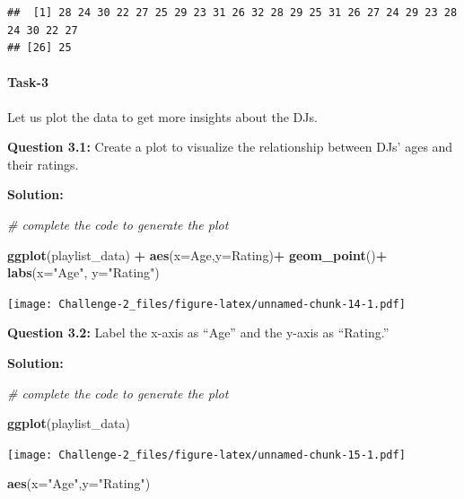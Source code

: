 \documentclass[
]{article}
\newenvironment{Shaded}{\begin{snugshade}}{\end{snugshade}}
\newcommand{\AttributeTok}[1]{\textcolor[rgb]{0.13,0.29,0.53}{#1}}
\newcommand{\CommentTok}[1]{\textcolor[rgb]{0.56,0.35,0.01}{\textit{#1}}}
\newcommand{\FunctionTok}[1]{\textcolor[rgb]{0.13,0.29,0.53}{\textbf{#1}}}
\newcommand{\NormalTok}[1]{#1}
\newcommand{\SpecialCharTok}[1]{\textcolor[rgb]{0.81,0.36,0.00}{\textbf{#1}}}
\newcommand{\StringTok}[1]{\textcolor[rgb]{0.31,0.60,0.02}{#1}}
\begin{document}
\begin{verbatim}
##  [1] 28 24 30 22 27 25 29 23 31 26 32 28 29 25 31 26 27 24 29 23 28 24 30 22 27
## [26] 25
\end{verbatim}

\hypertarget{task-3}{%
\paragraph{Task-3}\label{task-3}}

Let us plot the data to get more insights about the DJs.

\textbf{Question 3.1:} Create a plot to visualize the relationship
between DJs' ages and their ratings.

\textbf{Solution:}

\begin{Shaded}
\begin{Highlighting}[]
\CommentTok{\# complete the code to generate the plot}

\FunctionTok{ggplot}\NormalTok{(playlist\_data) }\SpecialCharTok{+}
\FunctionTok{aes}\NormalTok{(}\AttributeTok{x=}\NormalTok{Age,}\AttributeTok{y=}\NormalTok{Rating)}\SpecialCharTok{+} 
\FunctionTok{geom\_point}\NormalTok{()}\SpecialCharTok{+}
  \FunctionTok{labs}\NormalTok{(}\AttributeTok{x=}\StringTok{"Age"}\NormalTok{, }\AttributeTok{y=}\StringTok{"Rating"}\NormalTok{)}
\end{Highlighting}
\end{Shaded}

\texttt{[image: Challenge-2\_files/figure-latex/unnamed-chunk-14-1.pdf]}

\textbf{Question 3.2:} Label the x-axis as ``Age'' and the y-axis as
``Rating.''

\textbf{Solution:}

\begin{Shaded}
\begin{Highlighting}[]
\CommentTok{\# complete the code to generate the plot}

\FunctionTok{ggplot}\NormalTok{(playlist\_data) }
\end{Highlighting}
\end{Shaded}

\texttt{[image: Challenge-2\_files/figure-latex/unnamed-chunk-15-1.pdf]}

\begin{Shaded}
\begin{Highlighting}[]
\FunctionTok{aes}\NormalTok{(}\AttributeTok{x=}\StringTok{"Age"}\NormalTok{,}\AttributeTok{y=}\StringTok{"Rating"}\NormalTok{)}
\end{Highlighting}
\end{Shaded}
\end{document}
